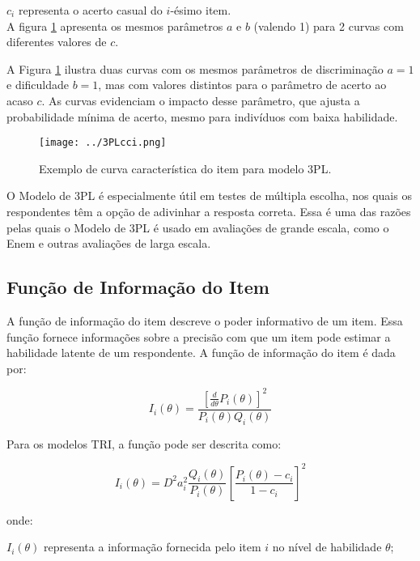 \noindent $c_i$ representa o acerto casual do $i$-ésimo item.\\


A figura \ref{fig:3PL} apresenta os mesmos parâmetros $a$ e $b$ (valendo 1) para 2 curvas com diferentes valores de $c$.

A Figura \ref{fig:3PL} ilustra duas curvas com os mesmos parâmetros de discriminação $a = 1$ e dificuldade $b = 1$, mas com valores distintos para o parâmetro de acerto ao acaso $c$. As curvas evidenciam o impacto desse parâmetro, que ajusta a probabilidade mínima de acerto, mesmo para indivíduos com baixa habilidade. 

\begin{figure}[H]
	\centering
	\caption{Exemplo de curva característica do item para modelo 3PL.}
	\texttt{[image: ../3PLcci.png]}
	\parbox{\textwidth}{
		\centering %
	}
	\label{fig:3PL}
\end{figure}

O Modelo de 3PL é especialmente útil em testes de múltipla escolha, nos quais os respondentes têm a opção de adivinhar a resposta correta. Essa é uma das razões pelas quais o Modelo de 3PL é usado em avaliações de grande escala, como o Enem \cite{inep2021} e outras avaliações de larga escala. 

\subsection{Função de Informação do Item}

A função de informação do item descreve o poder informativo de um item. Essa função fornece informações sobre a precisão com que um item pode estimar a habilidade latente de um respondente. \cite{de2000teoria} 
A função de informação do item é dada por:

\[
		I_i(\theta) = \dfrac{[\frac{d}{d\theta}P_i(\theta)]^2}{P_i(\theta)Q_i(\theta)}
\]

Para os modelos TRI, a função pode ser descrita como:

\begin{equation}\label{eq:info_item}
	I_i(\theta) = D^2 a_i^2\frac{Q_i(\theta)}{P_i(\theta)} \left[\frac{P_i(\theta) - c_i}{1 - c_i}\right]^2
\end{equation}

onde:

\noindent $I_i(\theta) $ representa a informação fornecida pelo item $i$ no nível de habilidade $\theta$;\\

